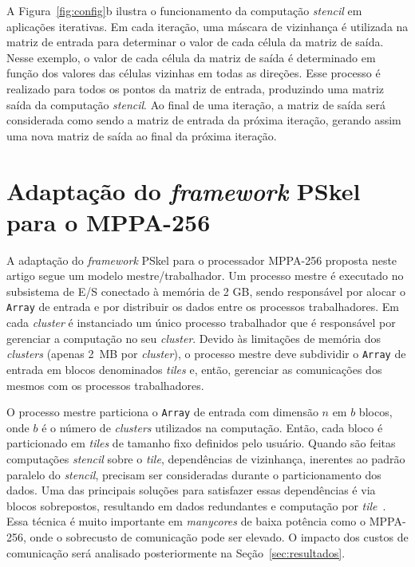 \documentclass[12pt]{article}
\newcommand{\fw}{\textit{framework}\xspace}
\newcommand{\pskel}{PSkel\xspace}
\newcommand{\mppa}{MPPA-256\xspace}
\newcommand{\stencil}{\textit{stencil}\xspace}
\begin{document}
A Figura~\ref{fig:config}b ilustra o funcionamento da computação \stencil em
aplicações iterativas. Em cada iteração, uma máscara de vizinhança é utilizada
na matriz de entrada para determinar o valor de cada célula da matriz de saída.
Nesse exemplo, o valor de cada célula da matriz de saída é determinado em função
dos valores das células vizinhas em todas as direções. Esse processo é realizado
para todos os pontos da matriz de entrada, produzindo uma matriz saída da
computação \stencil. Ao final de uma iteração, a matriz de saída será
considerada como sendo a matriz de entrada da próxima iteração, gerando assim
uma nova matriz de saída ao final da próxima iteração.

\section{Adaptação do \fw \pskel para o \mppa}
\label{sec:pskelMPPA}

A adaptação do \fw \pskel para o processador \mppa proposta neste artigo segue
um modelo mestre/trabalhador. Um processo mestre é executado no subsistema de E/S
conectado à memória \lpddr de 2 GB, sendo responsável por alocar o
\texttt{Array} de entrada e por distribuir os dados entre os processos
trabalhadores.
Em cada \textit{cluster} é instanciado um único processo trabalhador que é
responsável por gerenciar a computação no seu \textit{cluster}. Devido às
limitações de memória dos \textit{clusters} (apenas 2~MB por \textit{cluster}),
o processo mestre deve subdividir o \texttt{Array} de entrada em blocos
denominados \textit{tiles} e, então, gerenciar as comunicações dos mesmos com os
processos trabalhadores.

O processo mestre particiona o \texttt{Array} de entrada com dimensão $n$ em $b$
blocos, onde $b$ é o número de \textit{clusters} utilizados na computação.
Então, cada bloco é particionado em \textit{tiles} de tamanho fixo definidos
pelo usuário. Quando são feitas computações \stencil sobre o \textit{tile},
dependências de vizinhança, inerentes ao padrão paralelo do \stencil, precisam
ser consideradas durante o particionamento dos dados. Uma das principais
soluções para satisfazer essas dependências é via blocos sobrepostos, resultando
em dados redundantes e computação por
\textit{tile}~\cite{meng11,holewinski12,rocha17}. Essa técnica é muito
importante em \textit{manycores} de baixa potência como o \mppa, onde o
sobrecusto de comunicação pode ser elevado. O impacto dos custos de comunicação
será analisado posteriormente na Seção~\ref{sec:resultados}.
\end{document}
